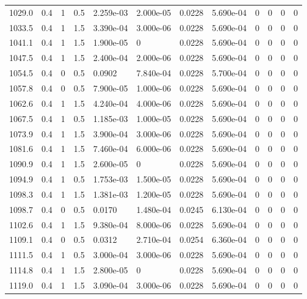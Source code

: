 \documentclass[preview]{standalone}
\begin{document}
{{{{{{\begin{tabular}{L{1.2cm}C{1.2cm} C{0.3cm}C{0.5cm} C{1.4cm}C{1.4cm} C{1.4cm}C{1.4cm} C{1.6cm}C{1.6cm} C{1.6cm}C{1.6cm}}
  1029.0  &   0.4  & 1     & 0.5 &  2.259e-03  & 2.000e-05  &  0.0228&   5.690e-04& 0 & 0   &  0 & 0  \\ 
  1033.5  &   0.4  & 1     & 1.5 &  3.390e-04  & 3.000e-06  &  0.0228&   5.690e-04& 0 & 0   &  0 & 0  \\ 
  1041.1  &   0.4  & 1     & 1.5 &  1.900e-05  & 0  &  0.0228&   5.690e-04& 0 & 0   &  0 & 0  \\ 
  1047.5  &   0.4  & 1     & 1.5 &  2.400e-04  & 2.000e-06  &  0.0228&   5.690e-04& 0 & 0   &  0 & 0  \\ 
  1054.5  &   0.4  & 0     & 0.5 &  0.0902  & 7.840e-04  &  0.0228&   5.700e-04& 0 & 0   &  0 & 0  \\ 
  1057.8  &   0.4  & 0     & 0.5 &  7.900e-05  & 1.000e-06  &  0.0228&   5.690e-04& 0 & 0   &  0 & 0  \\ 
  1062.6  &   0.4  & 1     & 1.5 &  4.240e-04  & 4.000e-06  &  0.0228&   5.690e-04& 0 & 0   &  0 & 0  \\ 
  1067.5  &   0.4  & 1     & 0.5 &  1.185e-03  & 1.000e-05  &  0.0228&   5.690e-04& 0 & 0   &  0 & 0  \\ 
  1073.9  &   0.4  & 1     & 1.5 &  3.900e-04  & 3.000e-06  &  0.0228&   5.690e-04& 0 & 0   &  0 & 0  \\ 
  1081.6  &   0.4  & 1     & 1.5 &  7.460e-04  & 6.000e-06  &  0.0228&   5.690e-04& 0 & 0   &  0 & 0  \\ 
  1090.9  &   0.4  & 1     & 1.5 &  2.600e-05  & 0  &  0.0228&   5.690e-04& 0 & 0   &  0 & 0  \\ 
  1094.9  &   0.4  & 1     & 0.5 &  1.753e-03  & 1.500e-05  &  0.0228&   5.690e-04& 0 & 0   &  0 & 0  \\ 
  1098.3  &   0.4  & 1     & 1.5 &  1.381e-03  & 1.200e-05  &  0.0228&   5.690e-04& 0 & 0   &  0 & 0  \\ 
  1098.7  &   0.4  & 0     & 0.5 &  0.0170  & 1.480e-04  &  0.0245&   6.130e-04& 0 & 0   &  0 & 0  \\ 
  1102.6  &   0.4  & 1     & 1.5 &  9.380e-04  & 8.000e-06  &  0.0228&   5.690e-04& 0 & 0   &  0 & 0  \\ 
  1109.1  &   0.4  & 0     & 0.5 &  0.0312  & 2.710e-04  &  0.0254&   6.360e-04& 0 & 0   &  0 & 0  \\ 
  1111.5  &   0.4  & 1     & 0.5 &  3.000e-04  & 3.000e-06  &  0.0228&   5.690e-04& 0 & 0   &  0 & 0  \\ 
  1114.8  &   0.4  & 1     & 1.5 &  2.800e-05  & 0  &  0.0228&   5.690e-04& 0 & 0   &  0 & 0  \\ 
  1119.0  &   0.4  & 1     & 1.5 &  3.090e-04  & 3.000e-06  &  0.0228&   5.690e-04& 0 & 0   &  0 & 0  \\ 

\end{tabular}}}}}}}
\end{document}
